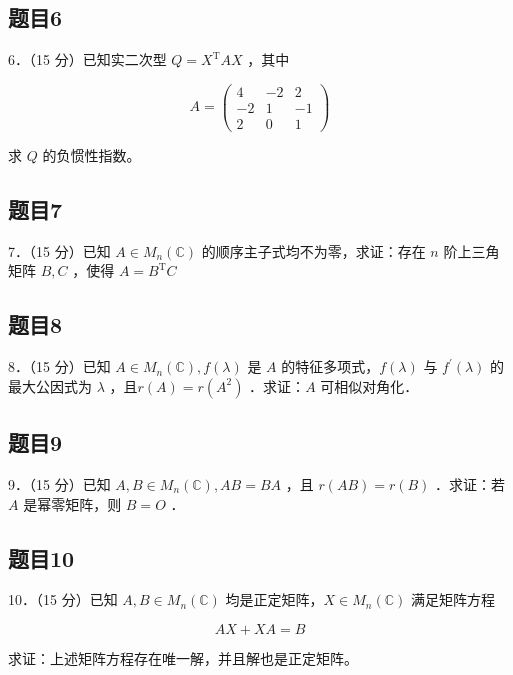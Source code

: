 \documentclass{article}
\begin{document}
\subsection{题目6}
6．（15 分）已知实二次型 \(Q=X^{\mathrm{T}} A X\) ，其中

\[
A=\left(\begin{array}{ccc}
4 & -2 & 2 \\
-2 & 1 & -1 \\
2 & 0 & 1
\end{array}\right)
\]

求 \(Q\) 的负惯性指数。

\subsection{题目7}
7．（15 分）已知 \(A \in M_{n}(\mathbb{C})\) 的顺序主子式均不为零，求证：存在 \(n\) 阶上三角矩阵 \(B, C\) ，使得 \(A=B^{\mathrm{T}} C\)

\subsection{题目8}
8．（15 分）已知 \(A \in M_{n}(\mathbb{C}), f(\lambda)\) 是 \(A\) 的特征多项式，\(f(\lambda)\) 与 \(f^{\prime}(\lambda)\) 的最大公因式为 \(\lambda\) ，且\(r(A)=r\left(A^{2}\right)\) ．求证：\(A\) 可相似对角化．

\subsection{题目9}
9．（15 分）已知 \(A, B \in M_{n}(\mathbb{C}), A B=B A\) ，且 \(r(A B)=r(B)\) ．求证：若 \(A\) 是幂零矩阵，则 \(B=O\) ．

\subsection{题目10}
10．（15 分）已知 \(A, B \in M_{n}(\mathbb{C})\) 均是正定矩阵，\(X \in M_{n}(\mathbb{C})\) 满足矩阵方程

\[
A X+X A=B
\]

求证：上述矩阵方程存在唯一解，并且解也是正定矩阵。
\end{document}
